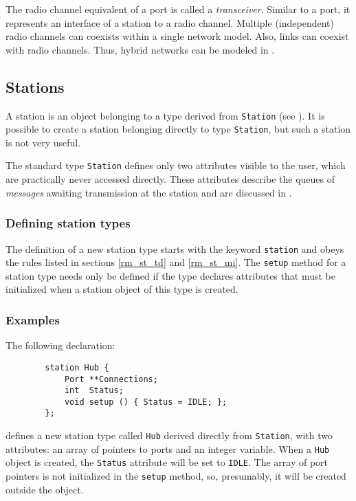 The radio channel equivalent of a port is called a {\em transceiver}.
Similar to a port, it represents an interface of a station to a
radio channel.
Multiple (independent) radio channels can coexists within a single network
model.
Also, links can coexist with radio channels.
Thus, hybrid networks can be modeled in \smurph.

\subsection{Stations}
\label{rm_to_st}

A station is an object belonging to a type derived from {\tt Station}
(see ).
It is possible to create a station belonging directly to type
{\tt Station}, but such a station is not very useful.

The standard type {\tt Station} defines only two attributes visible to the
user, which are practically never accessed directly.
These attributes describe the queues of {\em messages\/} awaiting transmission
at the station and are discussed in .

\subsubsection{Defining station types}
\label{rm_to_st_ds}

The definition of a new station type starts with the keyword {\tt station}
and obeys the rules listed in sections
\ref{rm_st_td} and \ref{rm_st_mi}.
The {\tt setup} method for a station type needs only be defined if the type
declares attributes that must be initialized when a station
object of this type is created.

\subsubsection*{Examples}

\noindent
The following declaration:
\begin{verbatim}
        station Hub {
            Port **Connections;
            int  Status;
            void setup () { Status = IDLE; };
        };
\end{verbatim}
defines a new station type called {\tt Hub} derived directly from
{\tt Station}, with two attributes: an array of pointers to
ports and an integer
variable.
When a {\tt Hub} object is created, the {\tt Status} attribute will
be set to {\tt IDLE}.
The array of port pointers is not initialized in the {\tt setup} method, so,
presumably, it will be created outside the object.

